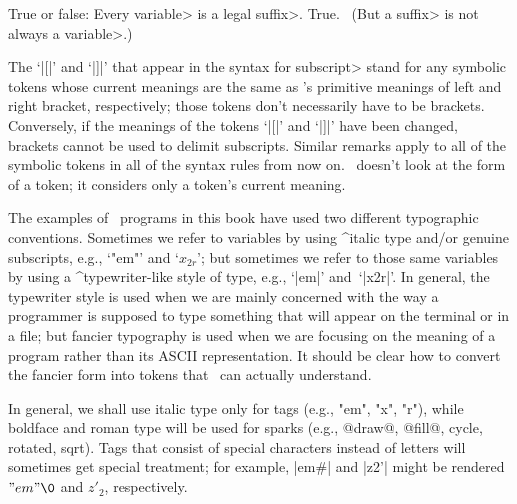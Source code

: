 {\dangerexercise True or false: Every \<variable> is a legal \<suffix>.
\answer True. \ (But a \<suffix> is not always a \<variable>.)

\ddanger The `|[|' and `|]|' that appear in the syntax for \<subscript>
stand for any symbolic tokens whose current meanings are the same as
\MF's primitive meanings of left and right bracket, respectively;
those tokens don't necessarily have to be brackets. Conversely, if the
meanings of the tokens `|[|' and `|]|' have been changed, brackets cannot
be used to delimit subscripts. Similar remarks apply to all of the
symbolic tokens in all of the syntax rules from now on. \MF\ doesn't look
at the form of a token; it considers only a token's current meaning.

The examples of \MF\ programs in this book have used two different
typographic conventions. Sometimes we refer to variables by using
^{italic type} and/or genuine subscripts, e.g., `"em"' and `$x_{2r}$';
but sometimes we refer to those same variables by using a ^{typewriter}-like
style of type, e.g., `|em|' and~`|x2r|'. In general, the typewriter style
is used when we are mainly concerned with the way a programmer is supposed
to type something that will appear on the terminal or in a file; but fancier
typography is used when we are focusing on the meaning of a program rather
than its ASCII representation. It should be clear how to convert the fancier
form into tokens that \MF\ can actually understand.

\danger In general, we shall use italic type only for tags (e.g., "em",
"x", "r"), while boldface and roman type will be used for sparks
(e.g., @draw@, @fill@, cycle, rotated, sqrt). Tags that consist of special
characters instead of letters will sometimes get special treatment;
for example, |em#| and |z2'| might be rendered $"em"\0$ and $z'_2$,
respectively.

}
